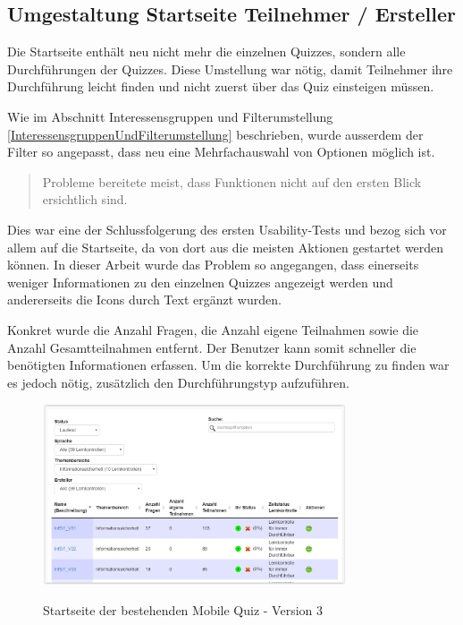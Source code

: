 \subsection{Umgestaltung Startseite Teilnehmer / Ersteller}

Die Startseite enthält neu nicht mehr die einzelnen Quizzes, sondern alle Durchführungen der Quizzes. Diese Umstellung war nötig, damit Teilnehmer ihre Durchführung leicht finden und nicht zuerst über das Quiz einsteigen müssen.

Wie im Abschnitt Interessensgruppen und Filterumstellung \ref{InteressensgruppenUndFilterumstellung} beschrieben, wurde ausserdem der Filter so angepasst, dass neu eine Mehrfachauswahl von Optionen möglich ist.

\bigskip\bigskip

\begin{quote}
	\glqq Probleme bereitete meist, dass Funktionen nicht auf den ersten Blick ersichtlich sind.\grqq
\end{quote}

Dies war eine der Schlussfolgerung des ersten \gls{Usability-Test}s und bezog sich vor allem auf die Startseite, da von dort aus die meisten Aktionen gestartet werden können. In dieser Arbeit wurde das Problem so angegangen, dass einerseits weniger Informationen zu den einzelnen Quizzes angezeigt werden und andererseits die Icons durch Text ergänzt wurden.

Konkret wurde die Anzahl Fragen, die Anzahl eigene Teilnahmen sowie die Anzahl Gesamtteilnahmen entfernt. Der Benutzer kann somit schneller die benötigten Informationen erfassen. Um die korrekte Durchführung zu finden war es jedoch nötig, zusätzlich den Durchführungstyp aufzuführen. 


\begin{figure}[H]
	\centering
	\includegraphics[width=0.8\textwidth]{Images/Startseite_alt.PNG}
	\caption{Startseite der bestehenden Mobile Quiz - Version 3}
	\cite{mobilequiz.ch}
\end{figure}


